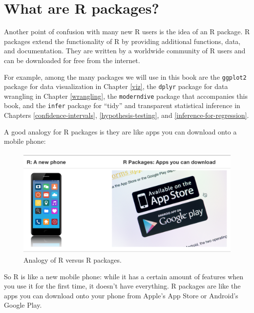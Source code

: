 \documentclass[]{book}
\begin{document}
\hypertarget{packages}{%
\section{What are R packages?}\label{packages}}

Another point of confusion with many new R users is the idea of an R package. R packages  extend the functionality of R by providing additional functions, data, and documentation. They are written by a worldwide community of R users and can be downloaded for free from the internet.

For example, among the many packages we will use in this book are the \texttt{ggplot2} package for data visualization in Chapter \ref{viz}, the \texttt{dplyr} package \citep{R-dplyr} for data wrangling in Chapter \ref{wrangling}, the \texttt{moderndive} package \citep{R-moderndive} that accompanies this book, and the \texttt{infer} package \citep{R-infer} for ``tidy'' and transparent statistical inference in Chapters \ref{confidence-intervals}, \ref{hypothesis-testing}, and \ref{inference-for-regression}.

A good analogy for R packages  is they are like apps you can download onto a mobile phone:

\begin{figure}

{\centering \includegraphics[width=0.7\linewidth]{images/shutterstock/R_vs_R_packages} 

}

\caption{Analogy of R versus R packages.}\label{fig:R-vs-R-packages}
\end{figure}

So R is like a new mobile phone: while it has a certain amount of features when you use it for the first time, it doesn't have everything. R packages are like the apps you can download onto your phone from Apple's App Store or Android's Google Play.
\end{document}
